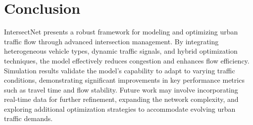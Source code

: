 \documentclass[conference]{IEEEtran}
\begin{document}
\section{Conclusion}
IntersectNet presents a robust framework for modeling and optimizing urban traffic flow through advanced intersection management. By integrating heterogeneous vehicle types, dynamic traffic signals, and hybrid optimization techniques, the model effectively reduces congestion and enhances flow efficiency. Simulation results validate the model's capability to adapt to varying traffic conditions, demonstrating significant improvements in key performance metrics such as travel time and flow stability. Future work may involve incorporating real-time data for further refinement, expanding the network complexity, and exploring additional optimization strategies to accommodate evolving urban traffic demands.
\end{document}
